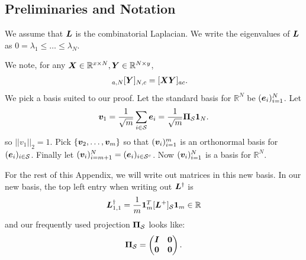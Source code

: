\subsection{Preliminaries and Notation}
We assume that $\bm{L}$ is the combinatorial Laplacian. We write the eigenvalues of $\bm{L}$ as $0 = \lambda_{1} \leq \ldots \leq \lambda_{N}$.

We note, for any $\bm{X}\in \mathbb{R}^{x \times N}, \bm{Y}\in \mathbb{R}^{N \times y }$,
\begin{align}
   [\matr{X}]_{a,N}[\matr{Y}]_{N,c} &= [\matr{X}\matr{Y}]_{ac}.
\end{align}
We pick a basis suited to our proof. Let the standard basis for $\mathbb{R}^{N}$ be $(\bm{e}_{i})_{i=1}^{N}$. Let
\begin{equation}
    \vect{v}_{1} = \frac{1}{\sqrt{m}}\sum_{i \in \set{S}} \vect{e}_{i} = \frac{1}{\sqrt{m}}\proj{S}\vect{1}_{N}.
\end{equation}
so $||v_{1}||_{2} = 1$. Pick $\{\bm{v}_{2} , \ldots, \bm{v}_{m}\}$ so that $(\bm{v}_{i})_{i=1}^{m}$ is an orthonormal basis for $(\bm{e}_{i})_{i \in \mathcal{S}}$. Finally let $(\bm{v}_{i})_{i=m+1}^{N} = (\bm{e}_{i})_{i \in \mathcal{S}^{c}}$. Now $(\bm{v}_{i})_{i=1}^{N}$ is a basis for $\mathbb{R}^{N}$.

For the rest of this Appendix, we will write out matrices in this new basis. In our new basis, the top left entry when writing out $\bm{L}^{\dagger}$ is 
\begin{equation}
    \bm{L}^{\dagger}_{1,1} = \frac{1}{m}\bm{1}_{m}^{T}[\bm{L}^{+}]_{\mathcal{S}}\bm{1}_{m} \in \mathbb{R}
\end{equation}
and our frequently used projection $\proj{S}$ looks like:
\begin{align}
    \proj{S} = \begin{pmatrix}
        \matr{I} & \matr{0} \\
        \matr{0} & \matr{0}
    \end{pmatrix}.
\end{align}

